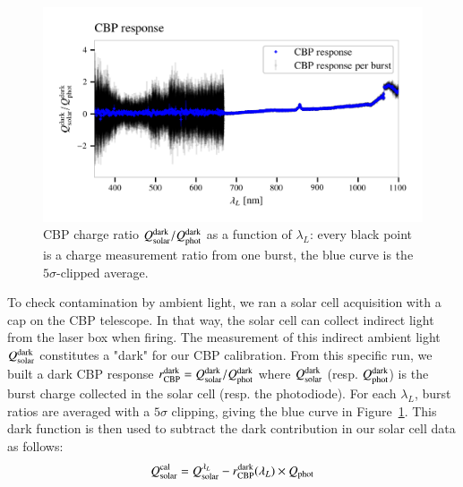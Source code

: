 




\begin{figure}[h]
    \centering
    \includegraphics[width=\columnwidth]{fig/sc_dark_qswMAX.png}
    \caption{CBP charge ratio $Q_{\mathrm{solar}}^{\rm dark}/Q_{\mathrm{phot}}^{\rm dark}$ as a function of $\lambda_L$: every black point is a charge measurement ratio from one burst, the blue curve is the $5\sigma$-clipped average.}
    \label{fig:sc_dark}
\end{figure}

To check contamination by ambient light, we ran a solar cell acquisition with a cap on the CBP telescope. In that way, the solar cell can collect indirect light from the laser box when firing. The measurement of this indirect ambient light $Q_{\mathrm{solar}}^{\rm dark}$ constitutes a "dark" for our CBP calibration. From this specific run, we built a dark CBP response $r_{\mathrm{CBP}}^{\rm dark} = Q_{\mathrm{solar}}^{\rm dark} / Q_{\mathrm{phot}}^{\rm dark}$ where $Q_{\mathrm{solar}}^{\rm dark}$ (resp. $Q_{\mathrm{phot}}^{\rm dark}$) is the burst charge collected in the solar cell (resp. the photodiode). For each $\lambda_L$, burst ratios are averaged with a $5\sigma$ clipping, giving the blue curve in Figure~\ref{fig:sc_dark}. This dark function is then used to subtract the dark contribution in our solar cell data as follows:
\begin{equation}
    Q_{\mathrm{solar}}^{\rm cal} = Q_{\mathrm{solar}}^{\lambda_L} - r_{\mathrm{CBP}}^{\rm dark}(\lambda_L) \times Q_{\mathrm{phot}} \end{equation}


